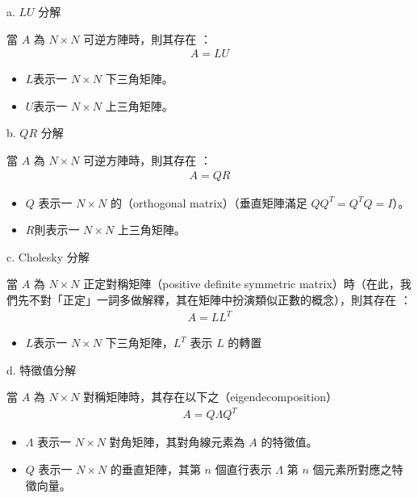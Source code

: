 \documentclass[letterpaper,10pt,english]{sphinxmanual}
\begin{document}
a. \(LU\) 分解

當 \(A\) 為 \(N \times N\) 可逆方陣時，則其存在 ：
\begin{equation*}
\begin{split}
A = LU
\end{split}
\end{equation*}\begin{itemize}
\item {} 
\(L\)表示一 \(N \times N\) 下三角矩陣。

\item {} 
\(U\)表示一 \(N \times N\) 上三角矩陣。

\end{itemize}

b. \(QR\) 分解

當 \(A\) 為 \(N \times N\) 可逆方陣時，則其存在 ：
\begin{equation*}
\begin{split}
A = QR
\end{split}
\end{equation*}\begin{itemize}
\item {} 
\(Q\) 表示一 \(N \times N\) 的（orthogonal matrix）（垂直矩陣滿足 \(Q Q^T = Q^T Q = I\)）。

\item {} 
\(R\)則表示一 \(N \times N\) 上三角矩陣。

\end{itemize}

c. Cholesky 分解

當 \(A\) 為 \(N \times N\) 正定對稱矩陣（positive definite symmetric matrix）時（在此，我們先不對「正定」一詞多做解釋，其在矩陣中扮演類似正數的概念），則其存在 ：
\begin{equation*}
\begin{split}
A = LL^T
\end{split}
\end{equation*}\begin{itemize}
\item {} 
\(L\)表示一 \(N \times N\) 下三角矩陣，\(L^T\) 表示 \(L\) 的轉置

\end{itemize}

d. 特徵值分解

當 \(A\) 為 \(N \times N\) 對稱矩陣時，其存在以下之（eigendecomposition）
\begin{equation*}
\begin{split}
A = Q \Lambda Q ^T
\end{split}
\end{equation*}\begin{itemize}
\item {} 
\(\Lambda\) 表示一 \(N \times N\) 對角矩陣，其對角線元素為 \(A\) 的特徵值。

\item {} 
\(Q\) 表示一 \(N \times N\) 的垂直矩陣，其第 \(n\) 個直行表示 \(\Lambda\) 第 \(n\) 個元素所對應之特徵向量。

\end{itemize}
\end{document}
